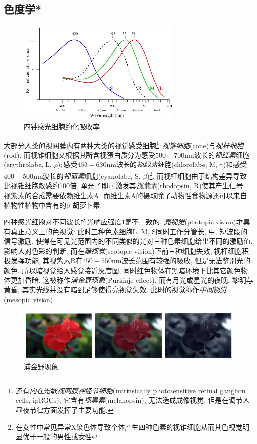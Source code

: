 \subsection{色度学*}
\begin{figure}
\vspace{-0.4cm}
\centering
\includegraphics[width=8cm]{image/5-8-1.png}
\caption{四钟感光细胞约化吸收率}\label{fig:phtsens}
\end{figure}
大部分人类的视网膜内有两种大类的视觉感受细胞\footnote{还有\emph{内在光敏视网膜神经节细胞}(intrinsically photosensitive retinal ganglion cells, ipRGCs), 它含有\emph{视黑素}(melanopsin), 无法造成成像视觉, 但是在调节人昼夜节律方面发挥了主要功能.}:\,\emph{视锥细胞}(cone)与\emph{视杆细胞}(rod). 而视锥细胞又根据其所含视蛋白质分为感受$500-700\mathrm{nm}$波长的\emph{视红素}细胞(erythrolabe, L, $\rho$);\,感受$450-630\mathrm{nm}$波长的\emph{视绿素}细胞(chlorolabe, M, $\gamma$)和感受$400-500\mathrm{nm}$波长的\emph{视蓝素}细胞(cyanolabe, S, $\beta$)\footnote{在女性中常见异常X染色体导致个体产生四种色素的视锥细胞从而其色视觉明显优于一般的男性或女性}. 而视杆细胞由于结构差异导致比视锥细胞敏感约100倍, 单光子即可激发其\emph{视紫素}(rhodopsin, R)使其产生信号. 视紫素的合成需要依赖维生素A. 而维生素A的摄取除了动物性食物源还可以来自植物性植物中含有的$\beta$-胡萝卜素.

四种感光细胞对不同波长的光响应强度\ref{fig:phtsens}是不一致的. \emph{亮视觉}(photopic vision)才具有真正意义上的色视觉: 此时三种色素细胞L, M, S同时工作分管长, 中, 短波段的信号激励. 使得在可见光范围内的不同类似的光对三种色素细胞给出不同的激励值. 影响人对色彩的判断. 而在\emph{暗视觉}(scotopic vision)下前三种细胞失效, 视杆细胞积极发挥功能, 其视紫素R在$450-550\mathrm{nm}$波长范围有较强的吸收, 但是无法鉴别光的颜色. 所以暗视觉给人感觉接近灰度图, 同时红色物体在黑暗环境下比其它颜色物体更加昏暗. 这被称作\emph{浦金野现象}(Purkinje effect). 而有月光或星光的夜晚, 黎明与黄昏, 其实光线并没有暗到足够使得亮视觉失效. 此时的视觉称作\emph{中间视觉}(mesopic vision).

\begin{figure}[H]
\centering
\includegraphics[width=16cm]{image/5-8-2.png}
\caption{浦金野现象}
\end{figure}

